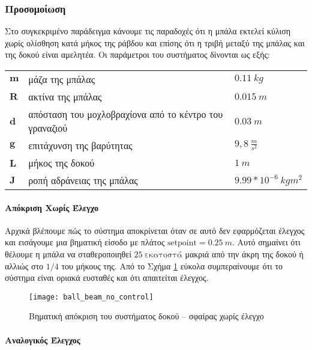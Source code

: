 \subsubsection{Προσομοίωση}

Στο συγκεκριμένο παράδειγμα κάνουμε τις παραδοχές ότι η μπάλα εκτελεί κύλιση χωρίς ολίσθηση κατά μήκος της ράβδου και επίσης ότι η τριβή μεταξύ της μπάλας και της δοκού είναι αμελητέα. Οι παράμετροι του συστήματος δίνονται ως εξής:
\begin{flushleft}
\begin{tabular}{lll}
$\mathbf{m}$ & μάζα της μπάλας & $0.11\ kg$ \\  
$\mathbf{R}$ & ακτίνα της μπάλας & $0.015\ m$ \\ 
$\mathbf{d}$ & απόσταση του μοχλοβραχίονα από το κέντρο του γραναζιού & $0.03\ m$ \\ 
$\mathbf{g}$ & επιτάχυνση της βαρύτητας & $9,8\ \frac{m}{s^2}$ \\ 
$\mathbf{L}$ & μήκος της δοκού & $1\ m$ \\ 
$\mathbf{J}$ & ροπή αδράνειας της μπάλας & $ 9.99*10^{-6}\ kgm^2 $ \\ 
\end{tabular}
\end{flushleft}

\paragraph{Απόκριση Χωρίς Έλεγχο}\hfill

Αρχικά βλέπουμε πώς το σύστημα αποκρίνεται όταν σε αυτό δεν εφαρμόζεται έλεγχος και εισάγουμε μια βηματική είσοδο με πλάτος $\text{setpoint}=0.25\ m$. Αυτό σημαίνει ότι θέλουμε η μπάλα να σταθεροποιηθεί $25\ \text{εκατοστά}$ μακριά από την άκρη της δοκού ή αλλιώς στο $1/4$ του μήκους της. Από το Σχήμα \ref{fig:ball_beam_no_control} εύκολα συμπεραίνουμε ότι το σύστημα είναι οριακά ευσταθές και ότι απαιτείται έλεγχος.

\begin{figure}[h]
  \centering
  \texttt{[image: ball\_beam\_no\_control]}
  \caption{Βηματική απόκριση του συστήματος δοκού -- σφαίρας χωρίς έλεγχο}
  \label{fig:ball_beam_no_control}
\end{figure}

\paragraph{Αναλογικός Έλεγχος}\hfill

